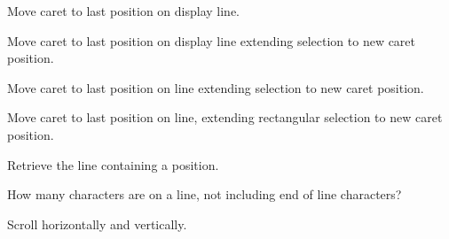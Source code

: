 
Move caret to last position on display line.


\label{wxstyledtextctrllineenddisplayextend}


Move caret to last position on display line extending selection to new
caret position.


\label{wxstyledtextctrllineendextend}


Move caret to last position on line extending selection to new caret position.


\label{wxstyledtextctrllineendrectextend}


Move caret to last position on line, extending rectangular selection to new caret position.


\label{wxstyledtextctrllineendwrap}



\label{wxstyledtextctrllineendwrapextend}



\label{wxstyledtextctrllinefromposition}


Retrieve the line containing a position.


\label{wxstyledtextctrllinelength}


How many characters are on a line, not including end of line characters?


\label{wxstyledtextctrllinescroll}


Scroll horizontally and vertically.


\label{wxstyledtextctrllinescrolldown}

